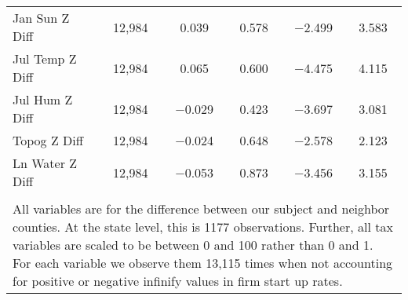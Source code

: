 \begin{table}[!htbp]
\begin{tabular}{@{\extracolsep{5pt}}lccccc}
Jan Sun Z Diff & 12,984 & 0.039 & 0.578 & $-$2.499 & 3.583 \\ 
Jul Temp Z Diff & 12,984 & 0.065 & 0.600 & $-$4.475 & 4.115 \\ 
Jul Hum Z Diff & 12,984 & $-$0.029 & 0.423 & $-$3.697 & 3.081 \\ 
Topog Z Diff & 12,984 & $-$0.024 & 0.648 & $-$2.578 & 2.123 \\ 
Ln Water Z Diff & 12,984 & $-$0.053 & 0.873 & $-$3.456 & 3.155 \\ 
\hline \\[-1.8ex] 
\multicolumn{6}{l}{All variables are for the difference between our subject and neighbor counties. At the state level, this is 1177 observations. Further, all tax variables are scaled to be between 0 and 100 rather than 0 and 1. For each variable we observe them 13,115 times when not accounting for positive or negative infinify values in firm start up rates.} \\ 
\end{tabular} 
\end{table} 
